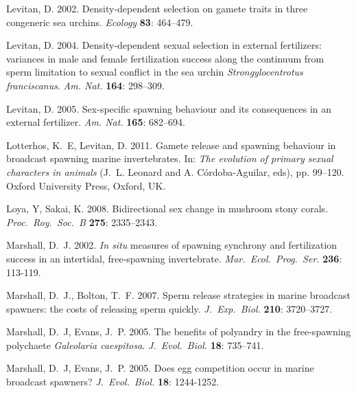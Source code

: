 \documentclass{article}
\begin{document}
\begin{thebibliography}{}
Levitan, D. 2002.
\newblock Density-dependent selection on gamete traits in three congeneric sea urchins.
\newblock \textit{Ecology} \textbf{83}: 464--479.

Levitan, D. 2004.
\newblock Density-dependent sexual selection in external fertilizers: variances in male and female fertilization success along the continuum from sperm limitation to sexual conflict in the sea urchin \textit{Strongylocentrotus franciscanus}.
\newblock \textit{Am. Nat.} \textbf{164}: 298--309.

Levitan, D. 2005.
\newblock Sex-specific spawning behaviour and its consequences in an external fertilizer.
\newblock \textit{Am. Nat.} \textbf{165}: 682--694.

Lotterhos, K.~E, Levitan, D. 2011.
\newblock Gamete release and spawning behaviour in broadcast spawning marine invertebrates.
\newblock In: \textit{The evolution of primary sexual characters in animals} (J.~L. Leonard and A. C\'{o}rdoba-Aguilar, eds), pp. 99--120. Oxford University Press, Oxford, UK.

Loya, Y, Sakai, K. 2008.
\newblock Bidirectional sex change in mushroom stony corals.
\newblock \textit{Proc.~Roy.~Soc.~B} \textbf{275}: 2335--2343.

Marshall, D.~J. 2002.
\newblock \textit{In situ} measures of spawning synchrony and fertilization success in an intertidal, free-spawning invertebrate.
\newblock \textit{Mar.~Ecol.~Prog.~Ser.} \textbf{236}: 113-119.

Marshall, D.~J., Bolton, T.~F. 2007.
\newblock Sperm release strategies in marine broadcast spawners: the costs of releasing sperm quickly.
\newblock \textit{J.~Exp.~Biol.} \textbf{210}: 3720--3727.

Marshall, D.~J, Evans, J.~P. 2005.
\newblock The benefits of polyandry in the free-spawning polychaete \textit{Galeolaria caespitosa}.
\newblock \textit{J.~Evol.~Biol.} \textbf{18}: 735--741.

Marshall, D.~J, Evans, J.~P. 2005.
\newblock Does egg competition occur in marine broadcast spawners? 
\newblock \textit{J.~Evol.~Biol.} \textbf{18}: 1244-1252.


\end{thebibliography}
\end{document}
